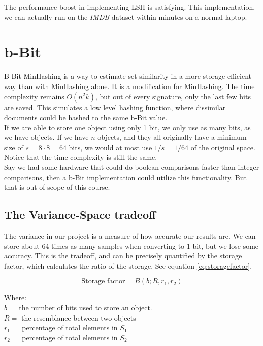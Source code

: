 \documentclass[a4paper,11pt]{article}
\begin{document}
The performance boost in implementing LSH is satisfying. This implementation, we can actually run on the \emph{IMDB} dataset within minutes on a normal laptop. \\


\section{b-Bit}
B-Bit MinHashing is a way to estimate set similarity in a more storage efficient way than with MinHashing alone. It is a modification for MinHashing. The time complexity remains $O(n^2k)$, but out of every signature, only the last few bits are saved. This simulates a low level hashing function, where dissimilar documents could be hashed to the same b-Bit value. \\

If we are able to store one object using only 1 bit, we only use as many bits, as we have objects. If we have $n$ objects, and they all originally have a minimum size of $s = 8 \cdot 8 = 64$ bits, we would at most use $1/s = 1/64$ of the original space. Notice that the time complexity is still the same. \\

Say we had some hardware that could do boolean comparisons faster than integer comparisons, then a b-Bit implementation could utilize this functionality. But that is out of scope of this course. \\


\subsection{The Variance-Space tradeoff}
The variance in our project is a measure of how accurate our results are. We can store about 64 times as many samples when converting to 1 bit, but we lose some accuracy. This is the tradeoff, and can be precisely quantified by the storage factor, which calculates the ratio of the  storage. See equation \ref{eq:storagefactor}.

\begin{equation}
    \text {Storage factor} = B(b;R,r_1,r_2)
    \label{eq:storagefactor}
\end{equation}

Where:\\
$b = $ the number of bits used to store an object. \\
$R = $ the resemblance between two objects \\
$r_1 = $ percentage of total elements in $S_1$ \\
$r_2 = $ percentage of total elements in $S_2$ \\
\end{document}
